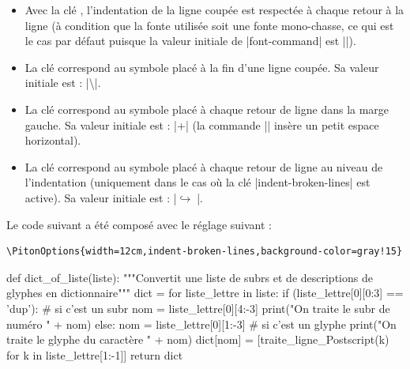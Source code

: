 \documentclass[dvipsnames,svgnames]{article}
\begin{document}
\begin{itemize}
\item {} Avec la clé ,
l'indentation de la ligne coupée est respectée à chaque retour à la ligne (à condition que
la fonte utilisée soit une fonte mono-chasse, ce qui est le cas par défaut puisque la
valeur initiale de |font-command| est |\ttfamily|).

\item {} La clé  correspond au
symbole placé à la fin d'une ligne coupée. Sa valeur initiale est :
|\hspace*{0.5em}\textbackslash|.

\item {} La clé  correspond au
symbole placé à chaque retour de ligne dans la marge gauche. Sa valeur initiale est :
|+\;| (la commande |\;| insère un petit espace horizontal).

\item {} La clé
 correspond au symbole placé à chaque
retour de ligne au niveau de l'indentation (uniquement dans le cas où la clé
|indent-broken-lines| est active). Sa valeur initiale est : |$\hookrightarrow\;$|.
\end{itemize}

\bigskip
Le code suivant a été composé avec le réglage suivant :  

\begin{Verbatim}
\PitonOptions{width=12cm,indent-broken-lines,background-color=gray!15}
\end{Verbatim}


\begin{center}
\begin{Piton}
def dict_of_liste(liste):
    """Convertit une liste de subrs et de descriptions de glyphes en dictionnaire"""
    dict = {}
    for liste_lettre in liste:
        if (liste_lettre[0][0:3] == 'dup'): # si c'est un subr
            nom = liste_lettre[0][4:-3]
            print("On traite le subr de numéro " + nom)
        else:
            nom = liste_lettre[0][1:-3] # si c'est un glyphe
            print("On traite le glyphe du caractère " + nom)
        dict[nom] = [traite_ligne_Postscript(k) for k in liste_lettre[1:-1]]
    return dict
\end{Piton}
\end{center}
\end{document}
